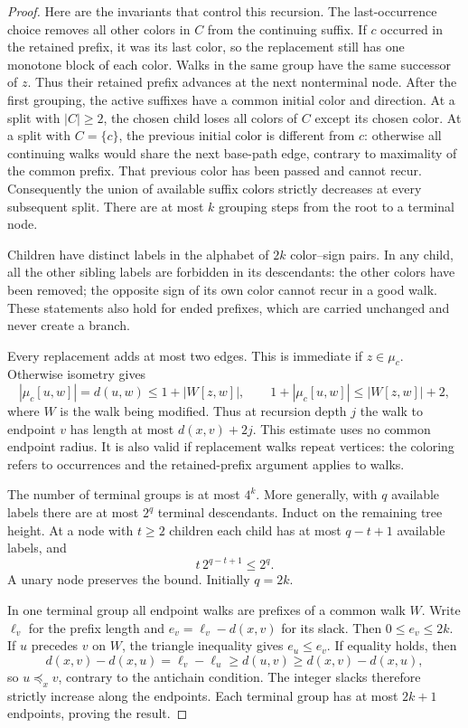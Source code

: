 \documentclass[11pt]{article}
\theoremstyle{remark}\newtheorem{remark}[theorem]{Remark}
\begin{document}
\begin{proof}
Here are the invariants that control this recursion. The last-occurrence
choice removes all other colors in $C$ from the continuing suffix. If $c$
occurred in the retained prefix, it was its last color, so the replacement
still has one monotone block of each color. Walks in the same group have the
same successor of $z$. Thus their retained prefix advances at the next
nonterminal node. After the first grouping, the active suffixes have a common
initial color and direction. At a split with $|C|\ge2$, the chosen child loses
all colors of $C$ except its chosen color. At a split with $C=\{c\}$, the
previous initial color is different from $c$: otherwise all continuing walks
would share the next base-path edge, contrary to maximality of the common
prefix. That previous color has been passed and cannot recur. Consequently
the union of available suffix colors strictly decreases at every subsequent
split. There are at most $k$ grouping steps from the root to a terminal node.

Children have distinct labels in the alphabet of $2k$ color--sign pairs.
In any child, all the other sibling labels are forbidden in its descendants:
the other colors have been removed; the opposite sign of its own color
cannot recur in a good walk. These statements also hold for ended prefixes,
which are carried unchanged and never create a branch.

Every replacement adds at most two edges. This is immediate if $z\in\mu_c$.
Otherwise isometry gives
\[
 |\mu_c[u,w]|=d(u,w)\le1+|W[z,w]|,
 \qquad 1+|\mu_c[u,w]|\le |W[z,w]|+2,
\]
where $W$ is the walk being modified. Thus at recursion depth $j$ the walk
to endpoint $v$ has length at most $d(x,v)+2j$. This estimate uses no common
endpoint radius. It is also valid if replacement walks repeat vertices:
the coloring refers to occurrences and the retained-prefix argument applies
to walks.

The number of terminal groups is at most $4^k$. More generally, with $q$
available labels there are at most $2^q$ terminal descendants. Induct on the
remaining tree height. At a node with $t\ge2$ children each child has at most
$q-t+1$ available labels, and
\[
 t\,2^{q-t+1}\le2^q.
\]
A unary node preserves the bound. Initially $q=2k$.

In one terminal group all endpoint walks are prefixes of a common walk $W$.
Write $\ell_v$ for the prefix length and $e_v=\ell_v-d(x,v)$ for its slack.
Then $0\le e_v\le2k$. If $u$ precedes $v$ on $W$, the triangle inequality
gives $e_u\le e_v$. If equality holds, then
\[
 d(x,v)-d(x,u)=\ell_v-\ell_u\ge d(u,v)
                         \ge d(x,v)-d(x,u),
\]
so $u\preceq_x v$, contrary to the antichain condition. The integer slacks
therefore strictly increase along the endpoints. Each terminal group has
at most $2k+1$ endpoints, proving the result.
\end{proof}
\end{document}
